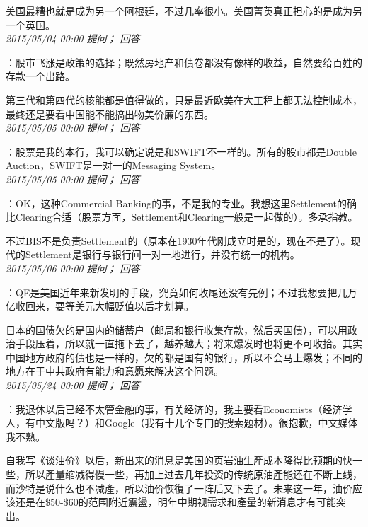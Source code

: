 \documentclass[twocolumn]{ctexart}
\begin{document}
美国最糟也就是成为另一个阿根廷，不过几率很小。美国菁英真正担心的是成为另一个英国。\\

\textit{\hfill\noindent\small 2015/05/04 00:00 提问； 回答}

：股市飞涨是政策的选择；既然房地产和债卷都没有像样的收益，自然要给百姓的存款一个出路。

第三代和第四代的核能都是值得做的，只是最近欧美在大工程上都无法控制成本，最终还是要看中国能不能搞出物美价廉的东西。\\

\textit{\hfill\noindent\small 2015/05/05 00:00 提问； 回答}

：股票是我的本行，我可以确定说是和SWIFT不一样的。所有的股市都是Double Auction，SWIFT是一对一的Messaging System。\\

\textit{\hfill\noindent\small 2015/05/05 00:00 提问； 回答}

：OK，这种Commercial Banking的事，不是我的专业。我想这里Settlement的确比Clearing合适（股票方面，Settlement和Clearing一般是一起做的）。多承指教。

不过BIS不是负责Settlement的（原本在1930年代刚成立时是的，现在不是了）。现代的Settlement是银行与银行间一对一地进行，并没有统一的机构。\\

\textit{\hfill\noindent\small 2015/05/06 00:00 提问； 回答}

：QE是美国近年来新发明的手段，究竟如何收尾还没有先例；不过我想要把几万亿收回来，要等美元大幅贬值以后才划算。

日本的国债欠的是国内的储蓄户（邮局和银行收集存款，然后买国债），可以用政治手段压着，所以就一直拖下去了，越养越大；将来爆发时也将更不可收拾。其实中国地方政府的债也是一样的，欠的都是国有的银行，所以不会马上爆发；不同的地方在于中共政府有能力和意愿来解决这个问题。\\

\textit{\hfill\noindent\small 2015/05/24 00:00 提问； 回答}

：我退休以后已经不太管金融的事，有关经济的，我主要看Economists（经济学人，有中文版吗？）和Google（我有十几个专门的搜索题材）。很抱歉，中文媒体我不熟。

自我写《谈油价》以后，新出来的消息是美国的页岩油生產成本降得比预期的快一些，所以產量缩减得慢一些，再加上过去几年投资的传统原油產能还在不断上线，而沙特是说什么也不减產，所以油价恢復了一阵后又下去了。未来这一年，油价应该还是在\$50-\$60的范围附近震盪，明年中期视需求和產量的新消息才有可能突出。\\
\end{document}

